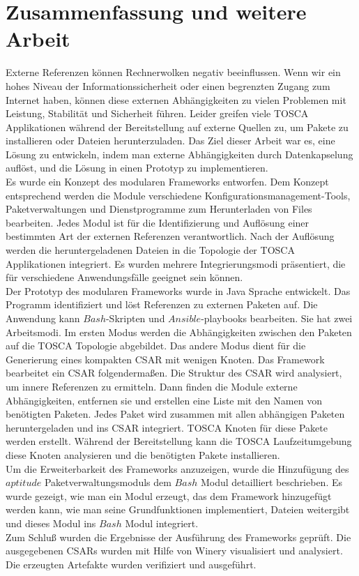 \chapter{Zusammenfassung und weitere Arbeit}\label{chap:zusfas}
Externe Referenzen können Rechnerwolken negativ beeinflussen. 
Wenn wir ein hohes Niveau der Informationssicherheit oder einen begrenzten Zugang zum Internet haben, können diese externen Abhängigkeiten zu vielen Problemen mit Leistung, Stabilität und Sicherheit führen. 
Leider greifen viele TOSCA Applikationen während der Bereitstellung auf externe Quellen zu, um Pakete zu installieren oder Dateien herunterzuladen. 
Das Ziel dieser Arbeit war es, eine Lösung zu entwickeln, indem man externe Abhängigkeiten durch Datenkapselung auflöst, und die Lösung in einen Prototyp zu implementieren.\\
Es wurde ein Konzept des modularen Frameworks entworfen. 
Dem Konzept entsprechend werden die Module verschiedene Konfigurationsmanagement-Tools, Paketverwaltungen und Dienstprogramme zum Herunterladen von Files bearbeiten. 
Jedes Modul ist für die Identifizierung und Auflösung einer bestimmten Art der externen Referenzen verantwortlich. 
Nach der Auflösung werden die heruntergeladenen Dateien in die Topologie der TOSCA Applikationen integriert. Es wurden mehrere Integrierungsmodi präsentiert, die für verschiedene Anwendungsfälle geeignet sein können.\\
Der Prototyp des modularen Frameworks wurde in Java Sprache entwickelt. 
Das Programm identifiziert und löst Referenzen zu externen Paketen auf. 
Die Anwendung kann $Bash$-Skripten und $Ansible$-playbooks bearbeiten. 
Sie hat zwei Arbeitsmodi. 
Im ersten Modus werden die Abhängigkeiten zwischen den Paketen auf die TOSCA Topologie abgebildet. 
Das andere Modus dient für die Generierung eines kompakten CSAR mit wenigen Knoten. 
Das Framework bearbeitet ein CSAR folgendermaßen. 
Die Struktur des CSAR wird analysiert, um innere Referenzen zu ermitteln. 
Dann finden die Module externe Abhängigkeiten, entfernen sie und erstellen eine Liste mit den Namen von benötigten Paketen. 
Jedes Paket wird zusammen mit allen abhängigen Paketen heruntergeladen und ins CSAR integriert. 
TOSCA Knoten für diese Pakete werden erstellt. 
Während der Bereitstellung kann die TOSCA Laufzeitumgebung diese Knoten analysieren und die benötigten Pakete installieren. \\
Um die Erweiterbarkeit des Frameworks anzuzeigen, wurde die Hinzufügung des $aptitude$ Paketverwaltungsmoduls dem $Bash$ Modul detailliert beschrieben. 
Es wurde gezeigt, wie man ein Modul erzeugt, das dem Framework hinzugefügt werden kann, wie man seine Grundfunktionen implementiert, Dateien weitergibt und dieses Modul ins $Bash$ Modul integriert.\\
Zum Schluß wurden die Ergebnisse der Ausführung des Frameworks geprüft. 
Die ausgegebenen CSARs wurden mit Hilfe von Winery visualisiert und analysiert. Die erzeugten Artefakte wurden verifiziert und ausgeführt.

